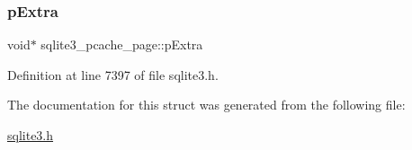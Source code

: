 \subsubsection{\texorpdfstring{p\+Extra}{pExtra}}
{\footnotesize\ttfamily void$\ast$ sqlite3\+\_\+pcache\+\_\+page\+::p\+Extra}



Definition at line 7397 of file sqlite3.\+h.



The documentation for this struct was generated from the following file\+:\begin{DoxyCompactItemize}
\item 
\mbox{\hyperlink{sqlite3_8h}{sqlite3.\+h}}\end{DoxyCompactItemize}
